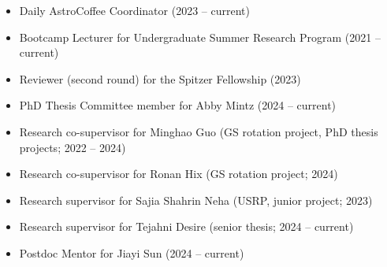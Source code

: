 \documentclass[12pt]{article}
\begin{document}
\begin{itemize}
    \item Daily AstroCoffee Coordinator (2023 -- current)
    \item Bootcamp Lecturer for Undergraduate Summer Research Program (2021 -- current)
    \item Reviewer (second round) for the Spitzer Fellowship (2023)
    \item PhD Thesis Committee member for Abby Mintz (2024 -- current)
    \item Research co-supervisor for Minghao Guo (GS rotation project, PhD thesis projects; 2022 -- 2024)
    \item Research co-supervisor for Ronan Hix (GS rotation project; 2024)
    \item Research supervisor for Sajia Shahrin Neha (USRP, junior project; 2023)
    \item Research supervisor for Tejahni Desire (senior thesis; 2024 -- current)
    \item Postdoc Mentor for Jiayi Sun (2024 -- current)
\end{itemize}
\end{document}
